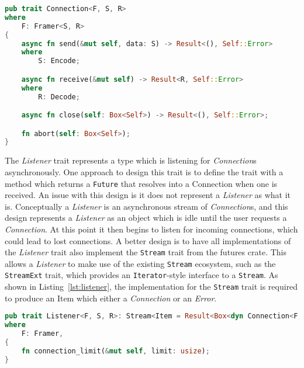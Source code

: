 \documentclass{l4proj}
\begin{document}
\begin{lstlisting}[language=Rust, float=h, label=lst:connection, caption={The Connection trait.}]
pub trait Connection<F, S, R>
where
    F: Framer<S, R>
{
    async fn send(&mut self, data: S) -> Result<(), Self::Error>
    where
        S: Encode;

    async fn receive(&mut self) -> Result<R, Self::Error>
    where
        R: Decode;

    async fn close(self: Box<Self>) -> Result<(), Self::Error>;

    fn abort(self: Box<Self>);
}
\end{lstlisting}

The \emph{Listener} trait represents a type which is listening for \emph{Connection}s asynchronously.
One approach to design this trait is to define the trait with a method which returns a \texttt{Future} that resolves
into a Connection when one is received.
An issue with this design is it does not represent a \emph{Listener} as what it is.
Conceptually a \emph{Listener} is an asynchronous stream of \emph{Connection}s, and this design represents a
\emph{Listener} as an object which is idle until the user requests a \emph{Connection}.
At this point it then begins to listen for incoming connections, which could lead to lost connections.
A better design is to have all implementations of the \emph{Listener} trait also implement the \texttt{Stream} trait
from the futures crate.
This allows a \emph{Listener} to make use of the existing \texttt{Stream} ecosystem, such as the \texttt{StreamExt}
trait, which provides an \texttt{Iterator}-style interface to a \texttt{Stream}.
As shown in Listing~\ref{lst:listener}, the implementation for the \texttt{Stream} trait is required to produce an Item
which either a \emph{Connection} or an \emph{Error}.

\begin{lstlisting}[language=Rust, float=h, label=lst:listener, caption={The Listener trait, showing the Stream
    implementation requirement for all implementers.}]
pub trait Listener<F, S, R>: Stream<Item = Result<Box<dyn Connection<F, S, R>>, Error>>
where
    F: Framer,
{
    fn connection_limit(&mut self, limit: usize);
}

\end{lstlisting}
\end{document}
